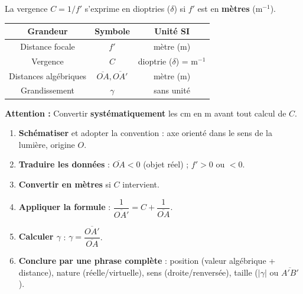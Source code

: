 \documentclass[11pt]{article}
\begin{document}
\begin{aretenir}
La vergence $C = 1/f'$ s'exprime en dioptries ($\delta$) si $f'$ est en \textbf{mètres} ($\text{m}^{-1}$).
\begin{center}
\begin{tabular}{|c|c|c|}
\hline
\rowcolor{popblueL} Grandeur & Symbole & Unité SI \\
\hline
Distance focale & $f'$ & mètre (m) \\
\hline
Vergence & $C$ & dioptrie ($\delta$) = $\text{m}^{-1}$ \\
\hline
Distances algébriques & $\overline{OA}, \overline{OA'}$ & mètre (m) \\
\hline
Grandissement & $\gamma$ & sans unité \\
\hline
\end{tabular}
\end{center}
\textbf{Attention :} Convertir \textbf{systématiquement} les cm en m avant tout calcul de $C$.
\end{aretenir}

\begin{methode}
\begin{enumerate}
\item \textbf{Schématiser} et adopter la convention : axe orienté dans le sens de la lumière, origine $O$.
\item \textbf{Traduire les données} : $\overline{OA} < 0$ (objet réel) ; $f' > 0$ ou $<0$.
\item \textbf{Convertir en mètres} si $C$ intervient.
\item \textbf{Appliquer la formule} : $\dfrac{1}{\overline{OA'}} = C + \dfrac{1}{\overline{OA}}$.
\item \textbf{Calculer $\gamma$} : $\gamma = \dfrac{\overline{OA'}}{\overline{OA}}$.
\item \textbf{Conclure par une phrase complète} : position (valeur algébrique + distance), nature (réelle/virtuelle), sens (droite/renversée), taille ($|\gamma|$ ou $\overline{A'B'}$).
\end{enumerate}
\end{methode}
\end{document}
